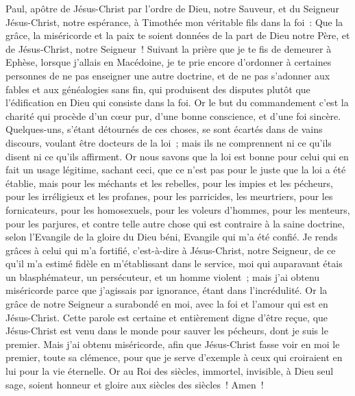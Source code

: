 \begin{multicols}{2}
\VerseOne{}Paul, apôtre de Jésus-Christ par l'ordre de Dieu, notre Sauveur, et du Seigneur Jésus-Christ, notre espérance,
à Timothée mon véritable fils dans la foi~: Que la grâce, la miséricorde et la paix te soient données de la part de Dieu notre Père, et de Jésus-Christ, notre Seigneur~!
Suivant la prière que je te fis de demeurer à Ephèse, lorsque j'allais en Macédoine, je te prie encore d'ordonner à certaines personnes de ne pas enseigner une autre doctrine,
et de ne pas s'adonner aux fables et aux généalogies sans fin, qui produisent des disputes plutôt que l'édification en Dieu qui consiste dans la foi.
Or le but du commandement c'est la charité qui procède d'un cœur pur, d'une bonne conscience, et d'une foi sincère.
Quelques-uns, s'étant détournés de ces choses, se sont écartés dans de vains discours,
voulant être docteurs de la loi~; mais ils ne comprennent ni ce qu'ils disent ni ce qu'ils affirment.
Or nous savons que la loi est bonne pour celui qui en fait un usage légitime,
sachant ceci, que ce n'est pas pour le juste que la loi a été établie, mais pour les méchants et les rebelles, pour les impies et les pécheurs, pour les irréligieux et les profanes, pour les parricides, les meurtriers,
pour les fornicateurs, pour les homosexuels, pour les voleurs d'hommes, pour les menteurs, pour les parjures, et contre telle autre chose qui est contraire à la saine doctrine,
selon l'Evangile de la gloire du Dieu béni, Evangile qui m'a été confié.
Je rends grâces à celui qui m'a fortifié, c'est-à-dire à Jésus-Christ, notre Seigneur, de ce qu'il m'a estimé fidèle en m'établissant dans le service,
moi qui auparavant étais un blasphémateur, un persécuteur, et un homme violent~; mais j'ai obtenu miséricorde parce que j'agissais par ignorance, étant dans l'incrédulité.
Or la grâce de notre Seigneur a surabondé en moi, avec la foi et l'amour qui est en Jésus-Christ.
Cette parole est certaine et entièrement digne d'être reçue, que Jésus-Christ est venu dans le monde pour sauver les pécheurs, dont je suis le premier.
Mais j'ai obtenu miséricorde, afin que Jésus-Christ fasse voir en moi le premier, toute sa clémence, pour que je serve d'exemple à ceux qui croiraient en lui pour la vie éternelle.
Or au Roi des siècles, immortel, invisible, à Dieu seul sage, soient honneur et gloire aux siècles des siècles~! Amen~!

\end{multicols}
